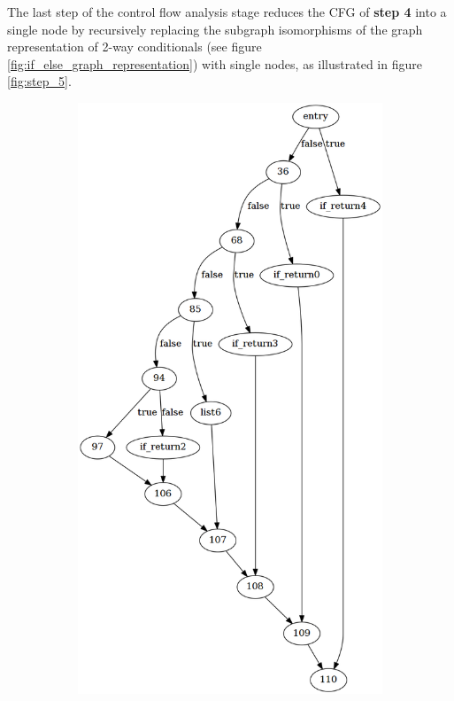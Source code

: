 The last step of the control flow analysis stage reduces the CFG of \textbf{step 4} into a single node by recursively replacing the subgraph isomorphisms of the graph representation of 2-way conditionals (see figure \ref{fig:if_else_graph_representation}) with single nodes, as illustrated in figure \ref{fig:step_5}.

\begin{figure}[htbp]
	\centering
	\begin{subfigure}[t]{0.45\textwidth}
		\includegraphics[width=\textwidth]{appendices/control_flow_analysis_example/stmt_4.png}

\end{subfigure}
\end{figure}
